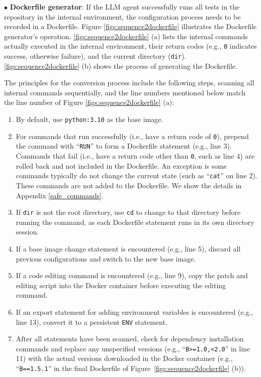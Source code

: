 $\bullet$ \textbf{Dockerfile generator}:
If the LLM agent successfully runs all tests in the repository in the internal environment, the configuration process needs to be recorded in a Dockerfile. Figure \ref{figs:sequence2dockerfile} illustrates the Dockerfile generator's operation. \ref{figs:sequence2dockerfile} (a) lists the internal commands actually executed in the internal environment, their return codes (e.g., \texttt{0} indicates success, otherwise failure), and the current directory (\texttt{dir}). \ref{figs:sequence2dockerfile} (b) shows the process of generating the Dockerfile.

The principles for the conversion process include the following steps, scanning all internal commands sequentially, and the line numbers mentioned below match the line number of Figure \ref{figs:sequence2dockerfile} (a):
\begin{enumerate}[nosep]
\item By default, use \texttt{python:3.10} as the base image.
\item For commands that run successfully (i.e., have a return code of \texttt{0}), prepend the command with ``\texttt{RUN}'' to form a Dockerfile statement (e.g., line 3). Commands that fail (i.e., have a return code other than \texttt{0}, such as line 4) are rolled back and not included in the Dockerfile. An exception is some commands typically do not change the current state (such as ``\texttt{cat}'' on line 2). These commands are not added to the Dockerfile. We show the details in Appendix \ref{safe_commands}.
\item If \texttt{dir} is not the root directory, use \texttt{cd} to change to that directory before running the command, as each Dockerfile statement runs in its own directory session.
\item If a base image change statement is encountered (e.g., line 5), discard all previous configurations and switch to the new base image.
\item If a code editing command is encountered (e.g., line 9), copy the patch and editing script into the Docker container before executing the editing command.
\item If an export statement for adding environment variables is encountered (e.g., line 13), convert it to a persistent \texttt{ENV} statement.
\item After all statements have been scanned, check for dependency installation commands and replace any unspecified versions (e.g., ``\texttt{B>=1.0,<2.0}'' in line 11) with the actual versions downloaded in the Docker container (e.g., ``\texttt{B==1.5.1}'' in the final Dockerfile of Figure~\ref{figs:sequence2dockerfile} (b)).
\end{enumerate}

